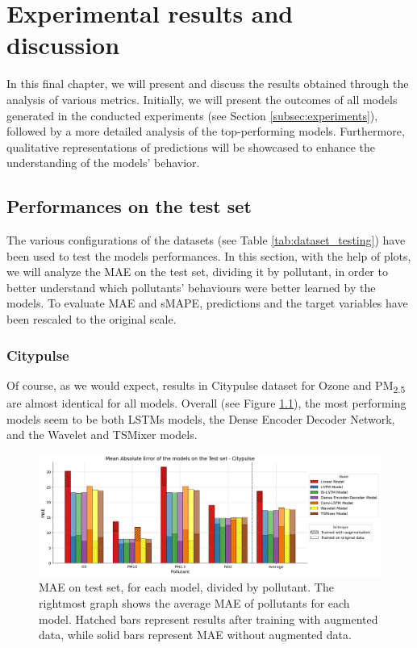 \chapter{Experimental results and discussion}
\label{chap:results}

In this final chapter, we will present and discuss the results obtained through the analysis of various metrics. Initially, we will present the outcomes of all models generated in the conducted experiments (see Section \ref{subsec:experiments}), followed by a more detailed analysis of the top-performing models. 
Furthermore, qualitative representations of predictions will be showcased to enhance the understanding of the models' behavior.



\section{Performances on the test set}
The various configurations of the datasets (see Table \ref{tab:dataset_testing}) have been used to test the models performances.
In this section, with the help of plots, we will analyze the MAE on the test set, dividing it by pollutant, in order to better understand which pollutants' behaviours were better learned  by the models. To evaluate MAE and sMAPE, predictions and the target variables have been rescaled to the original scale.

\subsection{Citypulse}

Of course, as we would expect, results in Citypulse dataset for Ozone and PM\textsubscript{2.5} are almost identical for all models.
Overall (see Figure \ref{fig:aarhus_results}), the most performing models seem to be both LSTMs models, the Dense Encoder Decoder Network, and the Wavelet and TSMixer models. 


\begin{figure}[h]
    \centering
    \includegraphics[width=1\linewidth]{images/Aarhus_results.png}
    \caption{MAE on test set, for each model, divided by pollutant. The rightmost graph shows the average MAE of pollutants for each model. Hatched bars represent results after training with augmented data, while solid bars represent MAE without augmented data.}
    \label{fig:aarhus_results}
\end{figure}

